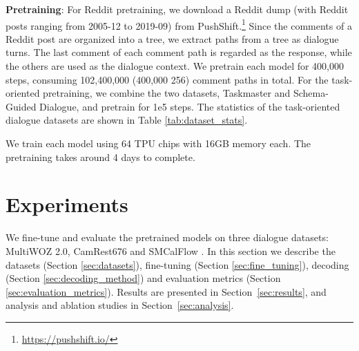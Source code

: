 \documentclass[11pt,a4paper]{article}
\begin{document}
\textbf{Pretraining}: For Reddit pretraining, we download a Reddit dump (with Reddit posts ranging from 2005-12 to 2019-09) from PushShift.\footnote{\url{https://pushshift.io/}} Since the comments of a Reddit post are organized into a tree, we extract paths from a tree as dialogue turns. The last comment of each comment path is regarded as the response, while the others are used as the dialogue context. We pretrain each model for 400,000 steps, consuming 102,400,000 (400,000  256) comment paths in total. For the task-oriented pretraining, we combine the two datasets, Taskmaster and Schema-Guided Dialogue, and pretrain for 1e5 steps. The statistics of the task-oriented dialogue datasets are shown in Table \ref{tab:dataset_stats}.

We train each model using 64 TPU chips with 16GB memory each. The pretraining takes around 4 days to complete. 

\section{Experiments}

We fine-tune and evaluate the pretrained models on three dialogue datasets: MultiWOZ 2.0, CamRest676 and SMCalFlow \cite{andreas2020task}. In this section we describe the datasets (Section \ref{sec:datasets}), fine-tuning (Section \ref{sec:fine_tuning}), decoding (Section \ref{sec:decoding_method}) and evaluation metrics (Section \ref{sec:evaluation_metrics}). Results are presented in Section~\ref{sec:results}, and analysis and ablation studies in Section~\ref{sec:analysis}. 
\end{document}
